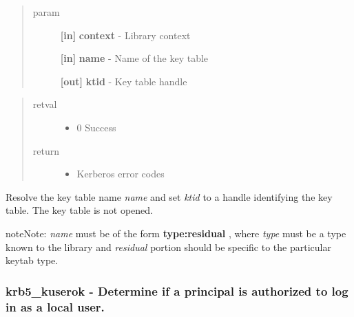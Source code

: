 \documentclass[letterpaper,10pt,english]{sphinxmanual}
\begin{document}
\begin{quote}\begin{description}
\item[{param}] \leavevmode
\textbf{{[}in{]}} \textbf{context} - Library context

\textbf{{[}in{]}} \textbf{name} - Name of the key table

\textbf{{[}out{]}} \textbf{ktid} - Key table handle

\end{description}\end{quote}
\begin{quote}\begin{description}
\item[{retval}] \leavevmode\begin{itemize}
\item {} 
0   Success

\end{itemize}

\item[{return}] \leavevmode\begin{itemize}
\item {} 
Kerberos error codes

\end{itemize}

\end{description}\end{quote}

Resolve the key table name \emph{name} and set \emph{ktid} to a handle identifying the key table. The key table is not opened.

\begin{notice}{note}{Note:}
\emph{name} must be of the form \textbf{type:residual} , where \emph{type} must be a type known to the library and \emph{residual} portion should be specific to the particular keytab type.
\end{notice}


\subsubsection{krb5\_kuserok -  Determine if a principal is authorized to log in as a local user.}
\label{appdev/refs/api/krb5_kuserok:krb5-kuserok-determine-if-a-principal-is-authorized-to-log-in-as-a-local-user}\label{appdev/refs/api/krb5_kuserok::doc}

\begin{fulllineitems}
\label{appdev/refs/api/krb5_kuserok:c.krb5_kuserok}
\end{fulllineitems}
\end{document}
